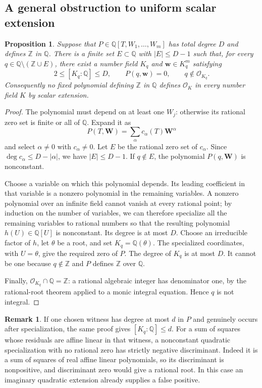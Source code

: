 \documentclass[11pt]{article}
\newtheorem{proposition}[theorem]{Proposition}
\theoremstyle{definition}
\newtheorem{remark}[theorem]{Remark}
\begin{document}
\subsection{A general obstruction to uniform scalar extension}

\begin{proposition}\label{prop:bounded-extension-false-positive}
Suppose that $P\in\mathbb Q[T,W_1,\ldots,W_m]$ has total degree $D$ and
defines $\mathbb Z$ in $\mathbb Q$.  There is a finite set
$E\subset\mathbb Q$ with $|E|\leq D-1$ such that, for every
$q\in\mathbb Q\setminus(\mathbb Z\cup E)$, there exist a number field
$K_q$ and $\mathbf w\in K_q^m$ satisfying
\[
 2\leq[K_q:\mathbb Q]\leq D,\qquad P(q,\mathbf w)=0,
 \qquad q\notin\mathcal O_{K_q}.
\]
Consequently no fixed polynomial defining $\mathbb Z$ in $\mathbb Q$
defines $\mathcal O_K$ in every number field $K$ by scalar extension.
\end{proposition}
\begin{proof}
The polynomial must depend on at least one $W_j$: otherwise its rational
zero set is finite or all of $\mathbb Q$.  Expand it as
\[
 P(T,\mathbf W)=\sum_{\alpha}c_{\alpha}(T)\mathbf W^{\alpha}
\]
and select $\alpha\ne0$ with $c_{\alpha}\ne0$.  Let $E$ be the rational
zero set of $c_{\alpha}$.  Since $\deg c_{\alpha}\leq D-|\alpha|$,
we have $|E|\leq D-1$.  If $q\notin E$, the polynomial
$P(q,\mathbf W)$ is nonconstant.

Choose a variable on which this polynomial depends.  Its leading
coefficient in that variable is a nonzero polynomial in the remaining
variables.  A nonzero polynomial over an infinite field cannot vanish
at every rational point; by induction on the number of variables,
we can therefore specialize all the remaining variables to rational
numbers so that the resulting polynomial $h(U)\in\mathbb Q[U]$ is
nonconstant.  Its degree is at most $D$.
Choose an irreducible factor of $h$, let $\theta$ be a root, and set
$K_q=\mathbb Q(\theta)$.  The specialized coordinates, with $U=\theta$,
give the required zero of $P$.  The degree of $K_q$ is at most $D$.
It cannot be one because $q\notin\mathbb Z$ and $P$ defines
$\mathbb Z$ over $\mathbb Q$.

Finally, $\mathcal O_{K_q}\cap\mathbb Q=\mathbb Z$: a rational
algebraic integer has denominator one, by the rational-root theorem
applied to a monic integral equation.  Hence $q$ is not integral.
\end{proof}

\begin{remark}
If one chosen witness has degree at most $d$ in $P$ and genuinely occurs
after specialization, the same proof gives $[K_q:\mathbb Q]\leq d$.
For a sum of squares whose residuals are affine linear in that witness,
a nonconstant quadratic specialization with no rational zero has
strictly negative discriminant.  Indeed it is a sum of squares of real
affine linear polynomials, so its discriminant is nonpositive, and
discriminant zero would give a rational root.  In this case an imaginary
quadratic extension already supplies a false positive.
\end{remark}
\end{document}
